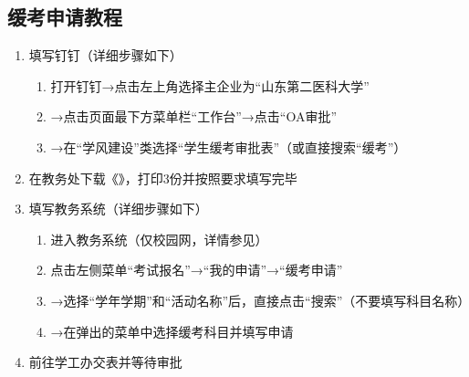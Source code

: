 \subsection[缓考申请教程]{缓考申请教程\footnotemark}
\begin{enumerate}
    \item 填写钉钉\footnotemark（详细步骤如下）
          \begin{enumerate}
              \item 打开钉钉→点击左上角选择主企业为“山东第二医科大学”
              \item →点击页面最下方菜单栏“工作台”→点击“OA审批”
              \item →在“学风建设”类选择“学生缓考审批表”（或直接搜索“缓考”）
          \end{enumerate}
    \item 在教务处下载《》，打印3份并按照要求填写完毕
    \item 填写教务系统（详细步骤如下）
          \begin{enumerate}
              \item 进入教务系统（仅校园网，详情参见）
              \item 点击左侧菜单“考试报名”→“我的申请”→“缓考申请”
              \item →选择“学年学期”和“活动名称”后，直接点击“搜索”（不要填写科目名称）
              \item →在弹出的菜单中选择缓考科目并填写申请\footnotemark
          \end{enumerate}
    \item 前往学工办交表并等待审批
\end{enumerate}

